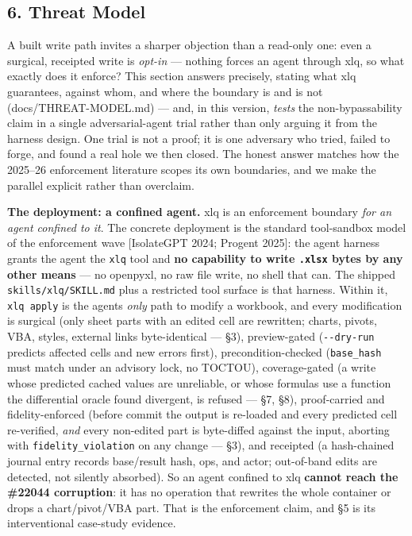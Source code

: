 \documentclass[
]{article}
\begin{document}
\subsection{6. Threat Model}\label{6-threat-model}

A built write path invites a sharper objection than a read-only one:
even a surgical, receipted write is \emph{opt-in} --- nothing forces an
agent through xlq, so what exactly does it enforce? This section answers
precisely, stating what xlq guarantees, against whom, and where the
boundary is and is not (docs/THREAT-MODEL.md) --- and, in this version,
\emph{tests} the non-bypassability claim in a single adversarial-agent
trial rather than only arguing it from the harness design. One trial is
not a proof; it is one adversary who tried, failed to forge, and found a
real hole we then closed. The honest answer matches how the 2025--26
enforcement literature scopes its own boundaries, and we make the
parallel explicit rather than overclaim.

\textbf{The deployment: a confined agent.} xlq is an enforcement
boundary \emph{for an agent confined to it}. The concrete deployment is
the standard tool-sandbox model of the enforcement wave {[}IsolateGPT
2024; Progent 2025{]}: the agent harness grants the agent the
\texttt{xlq} tool and \textbf{no capability to write \texttt{.xlsx}
bytes by any other means} --- no openpyxl, no raw file write, no shell
that can. The shipped \texttt{skills/xlq/SKILL.md} plus a restricted
tool surface is that harness. Within it, \texttt{xlq\ apply} is the
agent\textquotesingle s \emph{only} path to modify a workbook, and every
modification is surgical (only sheet parts with an edited cell are
rewritten; charts, pivots, VBA, styles, external links byte-identical
--- §3), preview-gated (\texttt{-\/-dry-run} predicts affected cells and
new errors first), precondition-checked (\texttt{base\_hash} must match
under an advisory lock, no TOCTOU), coverage-gated (a write whose
predicted cached values are unreliable, or whose formulas use a function
the differential oracle found divergent, is refused --- §7, §8),
proof-carried and fidelity-enforced (before commit the output is
re-loaded and every predicted cell re-verified, \emph{and} every
non-edited part is byte-diffed against the input, aborting with
\texttt{fidelity\_violation} on any change --- §3), and receipted (a
hash-chained journal entry records base/result hash, ops, and actor;
out-of-band edits are detected, not silently absorbed). So an agent
confined to xlq \textbf{cannot reach the \#22044 corruption}: it has no
operation that rewrites the whole container or drops a chart/pivot/VBA
part. That is the enforcement claim, and §5 is its interventional
case-study evidence.
\end{document}
